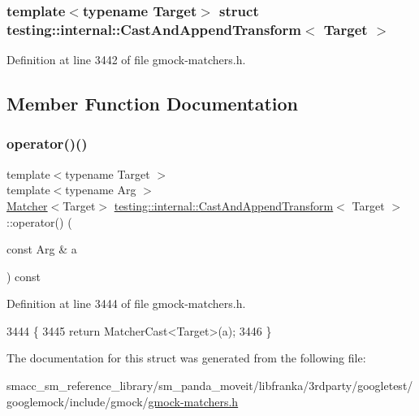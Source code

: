 \subsubsection*{template$<$typename Target$>$\newline
struct testing\+::internal\+::\+Cast\+And\+Append\+Transform$<$ Target $>$}



Definition at line 3442 of file gmock-\/matchers.\+h.



\subsection{Member Function Documentation}
\mbox{\label{structtesting_1_1internal_1_1CastAndAppendTransform_a90e722b0df4f0e6368bd89b848b71f45}} 
\subsubsection{\texorpdfstring{operator()()}{operator()()}}
{\footnotesize\ttfamily template$<$typename Target $>$ \\
template$<$typename Arg $>$ \\
\hyperlink{classtesting_1_1Matcher}{Matcher}$<$Target$>$ \hyperlink{structtesting_1_1internal_1_1CastAndAppendTransform}{testing\+::internal\+::\+Cast\+And\+Append\+Transform}$<$ Target $>$\+::operator() (\begin{DoxyParamCaption}\item[{const Arg \&}]{a }\end{DoxyParamCaption}) const\hspace{0.3cm}{\ttfamily [inline]}}



Definition at line 3444 of file gmock-\/matchers.\+h.


\begin{DoxyCode}
3444                                                  \{
3445     \textcolor{keywordflow}{return} MatcherCast<Target>(a);
3446   \}
\end{DoxyCode}


The documentation for this struct was generated from the following file\+:\begin{DoxyCompactItemize}
\item 
smacc\+\_\+sm\+\_\+reference\+\_\+library/sm\+\_\+panda\+\_\+moveit/libfranka/3rdparty/googletest/googlemock/include/gmock/\hyperlink{gmock-matchers_8h}{gmock-\/matchers.\+h}\end{DoxyCompactItemize}

